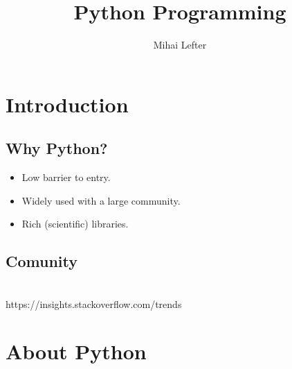 \documentclass[aspectratio=1610,slidestop]{beamer}
\author{Mihai Lefter}
\title{Python Programming}
\begin{document}

\makeTitleSlide{}



\section{Introduction}
\makeTableOfContents

\subsection{Why Python?}
\begin{pframe}
 \begin{itemize}
  \item Low barrier to entry.
  \item Widely used with a large community.
  \item Rich (scientific) libraries.
 \end{itemize}
\end{pframe}

\subsection{Comunity}
\begin{pframe}
 \begin{center}
  \\
  \tiny{https://insights.stackoverflow.com/trends}
 \end{center}
\end{pframe}

\section{About Python}
\end{document}
